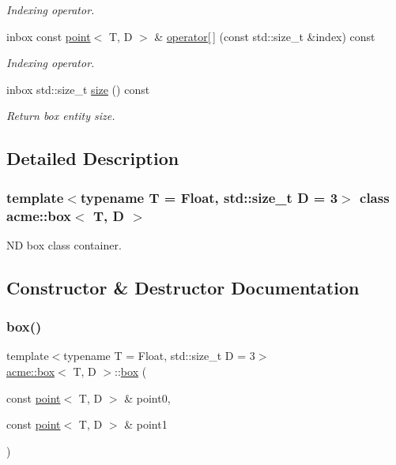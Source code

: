 \begin{DoxyCompactItemize}
\begin{DoxyCompactList}\small\item\em Indexing operator. \end{DoxyCompactList}\item 
inbox const \hyperlink{classacme_1_1point}{point}$<$ T, D $>$ \& \hyperlink{classacme_1_1box_a150ce3619323c45d342f0ea4443faa1b}{operator\mbox{[}$\,$\mbox{]}} (const std\+::size\+\_\+t \&index) const
\begin{DoxyCompactList}\small\item\em Indexing operator. \end{DoxyCompactList}\item 
\mbox{\label{classacme_1_1box_a300395efa130643b13a77200aff4ef07}} 
inbox std\+::size\+\_\+t \hyperlink{classacme_1_1box_a300395efa130643b13a77200aff4ef07}{size} () const
\begin{DoxyCompactList}\small\item\em Return box entity size. \end{DoxyCompactList}\end{DoxyCompactItemize}


\subsection{Detailed Description}
\subsubsection*{template$<$typename T = Float, std\+::size\+\_\+t D = 3$>$\newline
class acme\+::box$<$ T, D $>$}

ND box class container. 

\subsection{Constructor \& Destructor Documentation}
\mbox{\label{classacme_1_1box_a39e2f47274cc00029918d8d9cd0b641f}} 
\subsubsection{\texorpdfstring{box()}{box()}}
{\footnotesize\ttfamily template$<$typename T = Float, std\+::size\+\_\+t D = 3$>$ \\
\hyperlink{classacme_1_1box}{acme\+::box}$<$ T, D $>$\+::\hyperlink{classacme_1_1box}{box} (\begin{DoxyParamCaption}\item[{const \hyperlink{classacme_1_1point}{point}$<$ T, D $>$ \&}]{point0,  }\item[{const \hyperlink{classacme_1_1point}{point}$<$ T, D $>$ \&}]{point1 }\end{DoxyParamCaption})\hspace{0.3cm}{\ttfamily [inline]}}



